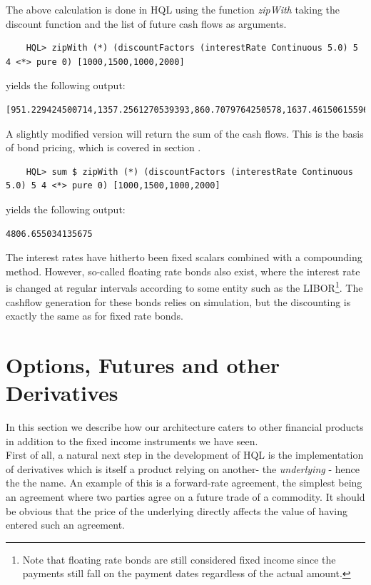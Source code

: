 	The above calculation is done in HQL using the function \textit{zipWith} taking the discount function and the list of future cash flows as arguments.
	\FrameSep
	\begin{lstlisting}
	HQL> zipWith (*) (discountFactors (interestRate Continuous 5.0) 5 4 <*> pure 0) [1000,1500,1000,2000]
	\end{lstlisting}
	\FrameSep
	yields the following output:
	\FrameSep
	\begin{lstlisting}[style=Output]
	[951.229424500714,1357.2561270539393,860.7079764250578,1637.4615061559637]
	\end{lstlisting}
	\FrameSep
	A slightly modified version will return the sum of the cash flows. This is the basis of bond pricing, which is covered in section .
	\FrameSep
	\begin{lstlisting}
	HQL> sum $ zipWith (*) (discountFactors (interestRate Continuous 5.0) 5 4 <*> pure 0) [1000,1500,1000,2000]
	\end{lstlisting}
	\FrameSep
	yields the following output:
	\FrameSep
	\begin{lstlisting}[style=Output]
	4806.655034135675
	\end{lstlisting}

The interest rates have hitherto been fixed scalars combined with a compounding 
method. However, so-called floating rate bonds also exist, where the interest 
rate is changed at regular intervals according to some entity such as the 
LIBOR\footnote{Note that floating rate bonds are still considered fixed 
income since the payments still fall on the payment dates regardless of the 
actual amount.}. The cashflow generation for these bonds relies on simulation, 
but the discounting is exactly the same as for fixed rate bonds.\\


\section{Options, Futures and other Derivatives}

In this section we describe how our architecture caters to other financial 
products in addition to the fixed income instruments we have seen.\\

First of all, a natural next step in the development of HQL is the 
implementation of derivatives which is itself a product relying on another- the 
\emph{underlying} - hence the the name. An example of this is 
a forward-rate agreement, the simplest being an agreement where two parties 
agree on a future trade of a commodity. It should be obvious that the price of 
the underlying directly affects the value of having entered such an agreement.\\

